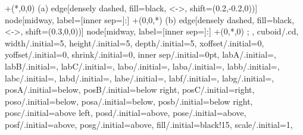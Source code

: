 {{{         +(*,0,0)
         (a)
         edge[densely dashed, fill=black, <->, shift={(0.2,-0.2,0))}]
         node[midway, label={[inner sep=]:}] {}
         +(0,0,*)
         (b)
         edge[densely dashed, fill=black, <->, shift={(0.3,0,0))}]
         node[midway, label={[inner sep=]:}] {}
         +(0,*,0)
    ;
  }},
  cuboid/.cd,
  width/.initial=5,
  height/.initial=5,
  depth/.initial=5,
  xoffset/.initial=0,
  yoffset/.initial=0,
  shrink/.initial=0,
  inner sep/.initial=0pt,
  labA/.initial=\empty,
  labB/.initial=\empty,
  labC/.initial=\empty,
  labo/.initial=\empty,
  laba/.initial=\empty,
  labb/.initial=\empty,
  labc/.initial=\empty,
  labd/.initial=\empty,
  labe/.initial=\empty,
  labf/.initial=\empty,
  labg/.initial=\empty,
  posA/.initial=below,
  posB/.initial=below right,
  posC/.initial=right,
  poso/.initial=below,
  posa/.initial=below,
  posb/.initial=below right,
  posc/.initial=above left,
  posd/.initial=above,
  pose/.initial=above,
  posf/.initial=above,
  posg/.initial=above,
  fill/.initial=black!15,
  scale/.initial=1,
}

